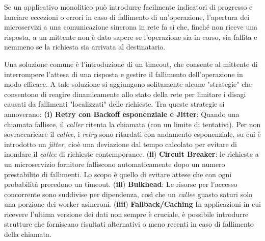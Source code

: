 Se un applicativo monolitico può introdurre facilmente indicatori di progresso e lanciare eccezioni o errori in caso di fallimento di un'operazione, l'apertura dei microservizi a una comunicazione sincrona in rete fa sì che, finché non riceve una risposta, a un mittente non è dato sapere se l'operazione sia in corso, sia fallita e nemmeno se la richiesta sia arrivata al destinatario.

Una soluzione comune è l'introduzione di un timeout, che consente al mittente di interrompere l'attesa di una risposta e gestire il fallimento dell'operazione in modo efficace.
A tale soluzione si aggiungono solitamente alcune "strategie" \cite{Thesis_microservices} che consentono di reagire dinamicamente allo stato della rete per limitare i disagi causati da fallimenti "localizzati" delle richieste.
Tra queste strategie si annoverano: \textbf{(i)} \textbf{Retry con Backoff esponenziale e Jitter}: Quando una chiamata fallisce, il \emph{caller} ritenta la chiamata (con un limite di tentativi).
Per non sovraccaricare il \emph{callee}, i \emph{retry} sono ritardati con andamento esponenziale, su cui è introdotto un \emph{jitter}, cioè una deviazione dal tempo calcolato per evitare di inondare il \emph{callee} di richieste contemporanee. (\textbf{ii}) \textbf{Circuit Breaker}: le richieste a un microservizio fornitore falliscono automaticamente dopo un numero prestabilito di fallimenti. Lo scopo è quello di evitare attese che con ogni probabilità precedono un timeout. (\textbf{iii}) \textbf{Bulkhead}: Le risorse per l'accesso concorrente sono suddivise per dipendenza, così che un \emph{callee} guasto saturi solo una porzione dei worker asincroni. (\textbf{iiii}) \textbf{Fallback/Caching} In applicazioni in cui ricevere l'ultima versione dei dati non sempre è cruciale, è possibile introdurre strutture che forniscano risultati alternativi o meno recenti in caso di fallimento della chiamata.

